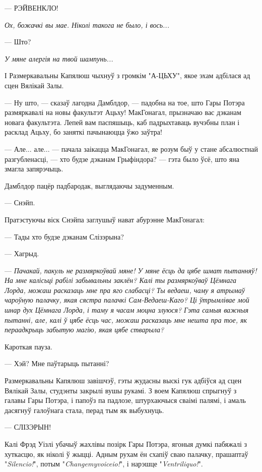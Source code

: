 --- РЭЙВЕНКЛО!

\later

\emph{Ох, божачкі вы мае. Ніколі такога не было, і вось...}

--- Што?

\emph{У мяне алергія на твой шампунь...}

І Размеркавальны Капялюш чыхнуў з громкім "А-ЦЬХУ", якое эхам адбілася ад сцен Вялікай
Залы.

--- Ну што, --- сказаў лагодна Дамблдор, --- падобна на тое, што Гары Потэра 
размяркавалі на новы факультэт Ацьху! МакГонагал, прызначаю вас дэканам новага 
факультэта. Лепей вам паспяшыць, каб падрыхтаваць вучэбны план і расклад Ацьху, бо 
заняткі пачынаюцца ўжо заўтра!

--- Але... але... --- пачала заікацца МакГонагал, яе розум быў у стане абсалюстнай
разгубленасці, --- хто будзе дэканам Грыфіндора? --- гэта было ўсё, што яна змагла 
запярэчыць.

Дамблдор пацёр падбародак, выглядаючы задуменным.

--- Снэйп.

Пратэстуючы віск Снэйпа заглушыў нават абурэнне МакГонагал:

--- Тады хто будзе дэканам Слізэрына?

--- Хагрыд.

\later

--- \emph{Пачакай, пакуль не размяркоўвай мяне! У мяне ёсць да цябе шмат  
пытанняў! На мне калісьці рабілі забывальны заклён?
Калі ты размяркоўваў Цёмнага Лорда, можаш расказаць мне пра яго слабасці? 
Ты ведаеш, чаму я атрымаў чароўную палачку, якая сястра палачкі Сам-Ведаеш-Каго?
Ці ўтрымлівае мой шнар дух Цёмнага Лорда, і таму я часам моцна злуюся?
Гэта самыя важныя пытанні, але, калі ў цябе ёсць час,
можаш расказаць мне нешта пра тое, як пераадкрыць забытую магію, якая цябе стварыла?}

Кароткая пауза.

--- Хэй? Мне паўтарыць пытанні?

Размеркавальны Капялюш завішчэў, гэты жудасны выскі гук адбіўся ад сцен Вялікай Залы,
студэнты закрылі вушы рукамі. З воем Капялюш спрыгнуў з галавы Гары Потэра,
і папоўз па падлозе, штурхаючыся сваімі палямі, і амаль дасягнуў галоўнага стала, 
перад тым як выбухнуць.

\later

--- СЛІЗЭРЫН!

Калі Фрэд Уізлі убачыў жахлівы позірк Гары Потэра, ягоныя думкі пабяжалі з хуткасцю, як
ніколі ў жыцці. Адным рухам ён схапіў сваю палачку, прашаптаў  "\emph{Silencio!}",
потым "\emph{Changemyvoiceio!}", і нарэшце "\emph{Ventriliquo!}".

